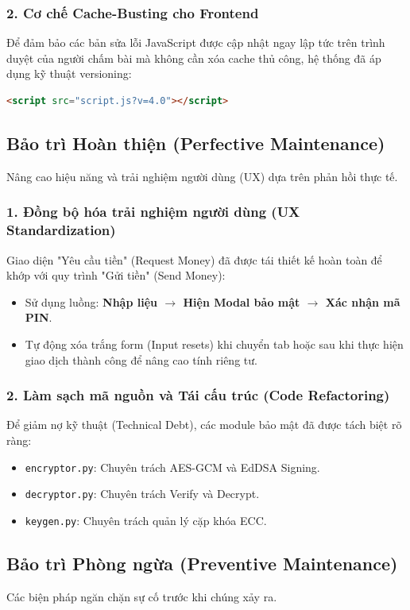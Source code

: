 \documentclass[11pt,a4paper]{article}
\begin{document}
\subsubsection{2. Cơ chế Cache-Busting cho Frontend}
Để đảm bảo các bản sửa lỗi JavaScript được cập nhật ngay lập tức trên trình duyệt của người chấm bài mà không cần xóa cache thủ công, hệ thống đã áp dụng kỹ thuật versioning:
\begin{lstlisting}[language=html]
<script src="script.js?v=4.0"></script>
\end{lstlisting}

\subsection{Bảo trì Hoàn thiện (Perfective Maintenance)}
Nâng cao hiệu năng và trải nghiệm người dùng (UX) dựa trên phản hồi thực tế.

\subsubsection{1. Đồng bộ hóa trải nghiệm người dùng (UX Standardization)}
Giao diện "Yêu cầu tiền" (Request Money) đã được tái thiết kế hoàn toàn để khớp với quy trình "Gửi tiền" (Send Money):
\begin{itemize}
    \item Sử dụng luồng: \textbf{Nhập liệu $\rightarrow$ Hiện Modal bảo mật $\rightarrow$ Xác nhận mã PIN}.
    \item Tự động xóa trắng form (Input resets) khi chuyển tab hoặc sau khi thực hiện giao dịch thành công để nâng cao tính riêng tư.
\end{itemize}

\subsubsection{2. Làm sạch mã nguồn và Tái cấu trúc (Code Refactoring)}
Để giảm nợ kỹ thuật (Technical Debt), các module bảo mật đã được tách biệt rõ ràng:
\begin{itemize}
    \item \texttt{encryptor.py}: Chuyên trách AES-GCM và EdDSA Signing.
    \item \texttt{decryptor.py}: Chuyên trách Verify và Decrypt.
    \item \texttt{keygen.py}: Chuyên trách quản lý cặp khóa ECC.
\end{itemize}

\subsection{Bảo trì Phòng ngừa (Preventive Maintenance)}
Các biện pháp ngăn chặn sự cố trước khi chúng xảy ra.
\end{document}
